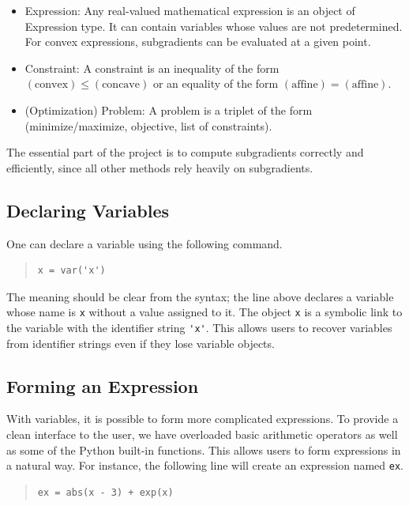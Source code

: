 \documentclass[12pt]{article}
\begin{document}
\begin{itemize}
\item Expression: Any real-valued mathematical expression is an object
of Expression type. It can contain variables whose values are not
predetermined. For convex expressions, subgradients can be evaluated at a given point.
\item Constraint: A constraint is an inequality of the form
$(\mbox{convex}) \le (\mbox{concave})$ or an equality of the form
$(\mbox{affine}) = (\mbox{affine})$.
\item (Optimization) Problem: A problem is a triplet of the form (minimize/maximize, objective, list of constraints).
\end{itemize}

\noindent The essential part of the project is to compute subgradients correctly
and efficiently, since all other methods rely heavily on subgradients.

\subsection{Declaring Variables}
One can declare a variable using the following command.

\begin{quote}
\begin{verbatim}
x = var('x')
\end{verbatim}
\end{quote}

\noindent The meaning should be clear from the syntax; the line above declares a
variable whose name is \verb'x' without a value assigned to it. The object \verb'x' is a symbolic link to the variable with the identifier string \verb,'x',. This allows users to recover variables from identifier strings even if they lose variable objects.

\subsection{Forming an Expression}
With variables, it is possible to form more complicated expressions. To
provide a clean interface to the user, we have overloaded basic arithmetic operators as
well as some of the Python built-in functions. This allows users to form
expressions in a natural way. For instance, the following line will create an expression named \verb'ex'.

\begin{quote}
\begin{verbatim}
ex = abs(x - 3) + exp(x)
\end{verbatim}
\end{quote}
\end{document}

